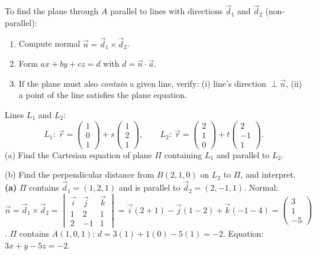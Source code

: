 \documentclass[11pt]{article}
\begin{document}
\begin{methode}
To find the plane through $A$ parallel to lines with directions $\vec{d}_1$ and $\vec{d}_2$ (non-parallel):
\begin{enumerate}
\item Compute normal $\vec{n}=\vec{d}_1\times\vec{d}_2$.
\item Form $ax+by+cz=d$ with $d=\vec{n}\cdot\vec{a}$.
\item If the plane must also \emph{contain} a given line, verify: (i) line's direction $\perp\vec{n}$, (ii) a point of the line satisfies the plane equation.
\end{enumerate}
\end{methode}

\begin{exoresolu}
Lines $L_1$ and $L_2$:
\[
L_1:\ \vec{r}=\begin{pmatrix}1\\0\\1\end{pmatrix}+s\begin{pmatrix}1\\2\\1\end{pmatrix},\qquad
L_2:\ \vec{r}=\begin{pmatrix}2\\1\\0\end{pmatrix}+t\begin{pmatrix}2\\-1\\1\end{pmatrix}.
\]
(a) Find the Cartesian equation of plane $\Pi$ containing $L_1$ and parallel to $L_2$.

(b) Find the perpendicular distance from $B(2,1,0)$ on $L_2$ to $\Pi$, and interpret.
\tcblower
\textbf{(a)} $\Pi$ contains $\vec{d}_1=(1,2,1)$ and is parallel to $\vec{d}_2=(2,-1,1)$.
Normal: $\vec{n}=\vec{d}_1\times\vec{d}_2=\begin{vmatrix}
\vec{i} & \vec{j} & \vec{k}\\
1 & 2 & 1\\
2 & -1 & 1
\end{vmatrix}=\vec{i}(2+1)-\vec{j}(1-2)+\vec{k}(-1-4)=\begin{pmatrix}3\\1\\-5\end{pmatrix}$.
$\Pi$ contains $A(1,0,1)$: $d=3(1)+1(0)-5(1)=-2$.
Equation: $\boxed{3x+y-5z=-2}$.


\end{exoresolu}
\end{document}
